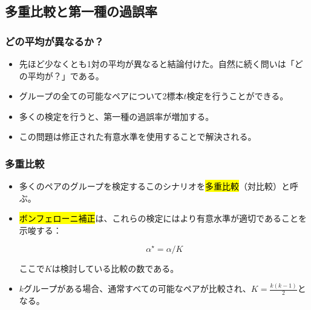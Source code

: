 
\subsection{多重比較と第一種の過誤率}


\begin{frame}
\frametitle{どの平均が異なるか？}

\begin{itemize}

\item 先ほど少なくとも1対の平均が異なると結論付けた。自然に続く問いは「どの平均が？」である。

\item グループの全ての可能なペアについて2標本$t$検定を行うことができる。

\end{itemize}


\begin{itemize}

\item 多くの検定を行うと、第一種の過誤率が増加する。

\item この問題は修正された有意水準を使用することで解決される。

\end{itemize}

\end{frame}


\begin{frame}
\frametitle{多重比較}

\begin{itemize}

\item 多くのペアのグループを検定するこのシナリオを\hl{多重比較}（対比較）と呼ぶ。

\item \hl{ボンフェローニ補正}は、これらの検定にはより有意水準が適切であることを示唆する：

\[ \alpha^\star = \alpha / K \]

ここで$K$は検討している比較の数である。

\item $k$グループがある場合、通常すべての可能なペアが比較され、$K = \frac{k (k - 1)}{2}$となる。

\end{itemize}

\end{frame}

